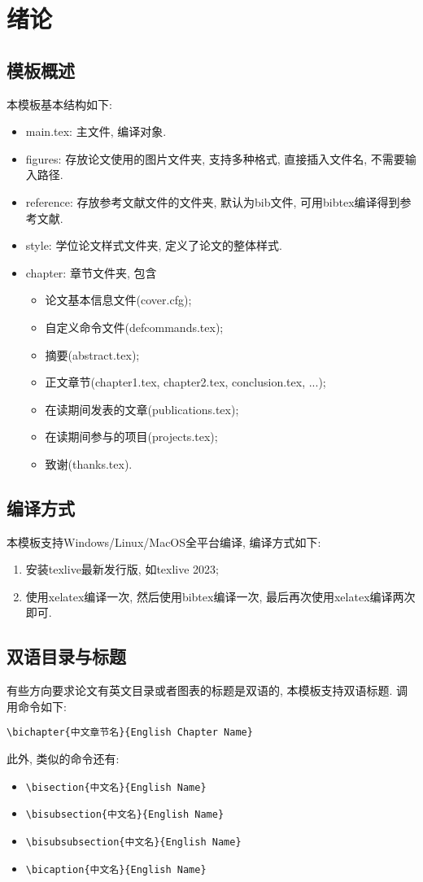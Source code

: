 \chapter{绪论} 
\label{chapter:Introduction}

\section{模板概述}
本模板基本结构如下:

\begin{itemize}
\item main.tex: 主文件, 编译对象.
\item figures: 存放论文使用的图片文件夹, 支持多种格式, 直接插入文件名, 不需要输入路径.
\item reference: 存放参考文献文件的文件夹, 默认为bib文件, 可用bibtex编译得到参考文献.
\item style: 学位论文样式文件夹, 定义了论文的整体样式.
\item chapter: 章节文件夹, 包含
\begin{itemize}
\item 论文基本信息文件(cover.cfg);
\item 自定义命令文件(defcommands.tex);
\item 摘要(abstract.tex);
\item 正文章节(chapter1.tex, chapter2.tex, conclusion.tex, ...);
\item 在读期间发表的文章(publications.tex);
\item 在读期间参与的项目(projects.tex);
\item 致谢(thanks.tex).
\end{itemize}
\end{itemize}

\section{编译方式}
本模板支持Windows/Linux/MacOS全平台编译, 编译方式如下:
\begin{enumerate}
\item 安装texlive最新发行版, 如texlive 2023;
\item 使用xelatex编译一次, 然后使用bibtex编译一次, 最后再次使用xelatex编译两次即可.
\end{enumerate}

\section{双语目录与标题}
有些方向要求论文有英文目录或者图表的标题是双语的, 本模板支持双语标题. 调用命令如下:
\begin{verbatim}
\bichapter{中文章节名}{English Chapter Name}
\end{verbatim}
此外, 类似的命令还有: 
\begin{itemize}
\item \verb|\bisection{中文名}{English Name}|
\item \verb|\bisubsection{中文名}{English Name}|
\item \verb|\bisubsubsection{中文名}{English Name}|
\item \verb|\bicaption{中文名}{English Name}|
\end{itemize}

